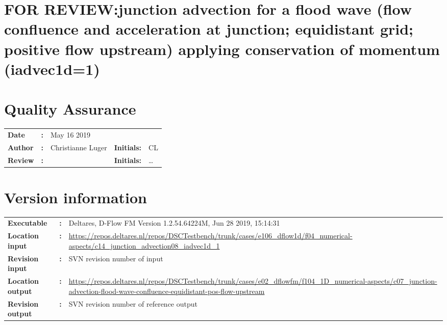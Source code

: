 

\section{FOR REVIEW:junction advection for a flood wave (flow confluence and acceleration at junction; equidistant grid; positive flow upstream) applying conservation of momentum (iadvec1d=1)}
\newrefsegment

\section*{Quality Assurance}
\begin{tabular}{@{}p{27mm}@{}p{0mm}p{\textwidth-52mm-48pt}p{15mm}p{10mm}}
\textbf{Date} & \textbf{:} &   May 16 2019\\ 
\textbf{Author} & \textbf{:} & Christianne Luger  & \textbf{Initials:} & CL \\
\textbf{Review} & \textbf{:} &   & \textbf{Initials:} & \ldots 
\end{tabular}

\section*{Version information}
{{
\begin{tabular}{@{}p{27mm}@{}p{0mm}p{\textwidth-27mm-24pt}}
\textbf{Executable}   & \textbf{:} & Deltares, D-Flow FM Version 1.2.54.64224M, Jun 28 2019, 15:14:31  \\
\textbf{Location input}     & \textbf{:} & \url{https://repos.deltares.nl/repos/DSCTestbench/trunk/cases/e106_dflow1d/f04_numerical-aspects/c14_junction_advection08_iadvec1d_1} \\
\textbf{Revision input} & \textbf{:} & SVN revision number of input \\
\textbf{Location output}     & \textbf{:} & \url{https://repos.deltares.nl/repos/DSCTestbench/trunk/cases/e02_dflowfm/f104_1D_numerical-aspects/c07_junction-advection-flood-wave-confluence-equidistant-pos-flow-upstream} \\
\textbf{Revision output} & \textbf{:} & SVN revision number of reference output
\end{tabular}
}}

